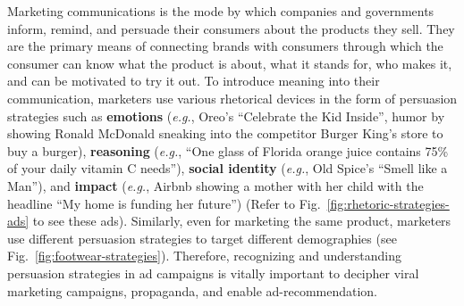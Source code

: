 Marketing communications is the mode by which companies and governments inform, remind, and persuade their consumers about the products they sell. They are the primary means of connecting brands with consumers through which the consumer can know what the product is about, what it stands for, who makes it, and can be motivated to try it out. To introduce meaning into their communication, marketers use various rhetorical devices in the form of persuasion strategies such as \textbf{emotions} ({\it e.g.}, Oreo's ``Celebrate the Kid Inside'', humor by showing Ronald McDonald sneaking into the competitor Burger King's store to buy a burger), \textbf{reasoning} ({\it e.g.}, ``One glass of Florida orange juice contains 75\% of your daily vitamin C needs''), \textbf{social identity} ({\it e.g.}, Old Spice's ``Smell like a Man''), and \textbf{impact} ({\it e.g.}, Airbnb showing a mother with her child with the headline ``My home is funding her future'') (Refer to Fig.~\ref{fig:rhetoric-strategies-ads} to see these ads). Similarly, even for marketing the same product, marketers use different persuasion strategies to target different demographies (see Fig.~\ref{fig:footwear-strategies}). Therefore, recognizing and understanding persuasion strategies in ad campaigns is vitally important to decipher viral marketing campaigns, propaganda, and enable ad-recommendation. 




